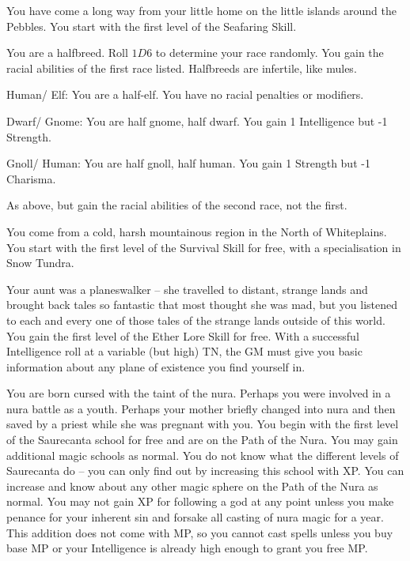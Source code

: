 \begin{multicols}{2}
\begin{list}{\addtocounter{list}{1}\textbf{:}}{\raggedleft}
	\item{You have come a long way from your little home on the little islands around the Pebbles.  You start with the first level of the Seafaring Skill.}

	\item{You are a halfbreed.  Roll $1D6$ to determine your race randomly.  You gain the racial abilities of the first race listed.  Halfbreeds are infertile, like mules.}

		\setcounter{enc}{1}
		\begin{list}{\addtocounter{enc}{1}-\addtocounter{enc}{1}:}{}
			\item{Human/ Elf: You are a half-elf.  You have no racial penalties or modifiers.}

			\item{Dwarf/ Gnome: You are half gnome, half dwarf.  You gain 1 Intelligence but -1 Strength.}

			\item{Gnoll/ Human: You are half gnoll, half human.  You gain 1 Strength but -1 Charisma.}
		\end{list}

\item{As above, but gain the racial abilities of the second race, not the first.}

\item{You come from a cold, harsh mountainous region in the North of Whiteplains.
You start with the first level of the Survival Skill for free, with a specialisation in Snow Tundra.}

\item{Your aunt was a planeswalker -- she travelled to distant, strange lands and brought back tales so fantastic that most thought she was mad, but you listened to each and every one of those tales of the strange lands outside of this world.
	You gain the first level of the Ether Lore Skill for free.
	With a successful Intelligence roll at a variable (but high) TN, the GM must give you basic information about any plane of existence you find yourself in.}

\item{You are born cursed with the taint of the nura.  Perhaps you were involved in a nura battle as a youth.  Perhaps your mother briefly changed into nura and then saved by a priest while she was pregnant with you.  You begin with the first level of the Saurecanta school for free and are on the Path of the Nura.  You may gain additional magic schools as normal.  You do not know what the different levels of Saurecanta do -- you can only find out by increasing this school with XP.  You can increase and know about any other magic sphere on the Path of the Nura as normal.  You may not gain XP for following a god at any point unless you make penance for your inherent sin and forsake all casting of nura magic for a year.  This addition does not come with MP, so you cannot cast spells unless you buy base MP or your Intelligence is already high enough to grant you free MP.}


\end{list}
\end{multicols}
